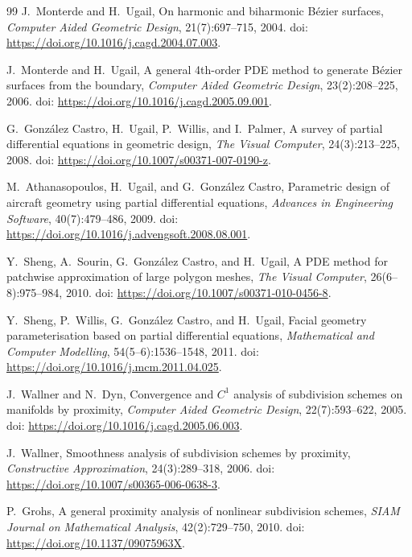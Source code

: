 \documentclass{article}
\theoremstyle{plain}
\theoremstyle{definition}
\begin{document}
\begin{thebibliography}{99}
J.\ Monterde and H.\ Ugail,
On harmonic and biharmonic B\'{e}zier surfaces,
\textit{Computer Aided Geometric Design}, 21(7):697--715, 2004.
doi: \url{https://doi.org/10.1016/j.cagd.2004.07.003}.

J.\ Monterde and H.\ Ugail,
A general 4th-order PDE method to generate B\'{e}zier surfaces from the boundary,
\textit{Computer Aided Geometric Design}, 23(2):208--225, 2006.
doi: \url{https://doi.org/10.1016/j.cagd.2005.09.001}.

G.\ Gonz\'{a}lez Castro, H.\ Ugail, P.\ Willis, and I.\ Palmer,
A survey of partial differential equations in geometric design,
\textit{The Visual Computer}, 24(3):213--225, 2008.
doi: \url{https://doi.org/10.1007/s00371-007-0190-z}.

M.\ Athanasopoulos, H.\ Ugail, and G.\ Gonz\'{a}lez Castro,
Parametric design of aircraft geometry using partial differential equations,
\textit{Advances in Engineering Software}, 40(7):479--486, 2009.
doi: \url{https://doi.org/10.1016/j.advengsoft.2008.08.001}.

Y.\ Sheng, A.\ Sourin, G.\ Gonz\'{a}lez Castro, and H.\ Ugail,
A PDE method for patchwise approximation of large polygon meshes,
\textit{The Visual Computer}, 26(6--8):975--984, 2010.
doi: \url{https://doi.org/10.1007/s00371-010-0456-8}.

Y.\ Sheng, P.\ Willis, G.\ Gonz\'{a}lez Castro, and H.\ Ugail,
Facial geometry parameterisation based on partial differential equations,
\textit{Mathematical and Computer Modelling}, 54(5--6):1536--1548, 2011.
doi: \url{https://doi.org/10.1016/j.mcm.2011.04.025}.

J.\ Wallner and N.\ Dyn,
Convergence and $C^1$ analysis of subdivision schemes on manifolds by proximity,
\textit{Computer Aided Geometric Design}, 22(7):593--622, 2005.
doi: \url{https://doi.org/10.1016/j.cagd.2005.06.003}.

J.\ Wallner,
Smoothness analysis of subdivision schemes by proximity,
\textit{Constructive Approximation}, 24(3):289--318, 2006.
doi: \url{https://doi.org/10.1007/s00365-006-0638-3}.

P.\ Grohs,
A general proximity analysis of nonlinear subdivision schemes,
\textit{SIAM Journal on Mathematical Analysis}, 42(2):729--750, 2010.
doi: \url{https://doi.org/10.1137/09075963X}.


\end{thebibliography}
\end{document}
